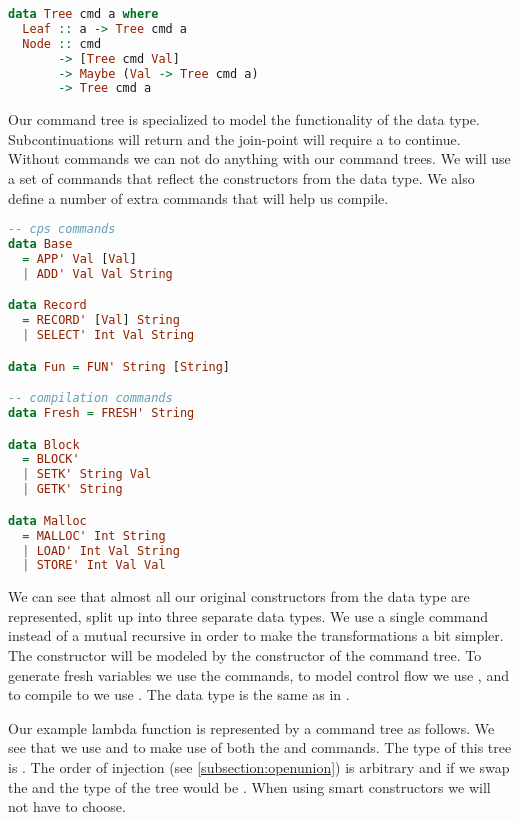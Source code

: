 \begin{lstlisting}[language=Haskell]
data Tree cmd a where
  Leaf :: a -> Tree cmd a
  Node :: cmd
       -> [Tree cmd Val]
       -> Maybe (Val -> Tree cmd a)
       -> Tree cmd a
\end{lstlisting}

Our command tree is specialized to model the functionality of the  data type. Subcontinuations will return  and the join-point will require a  to continue. Without commands we can not do anything with our command trees. We will use a set of commands that reflect the constructors from the  data type. We also define a number of extra commands that will help us compile.

\begin{lstlisting}[language=Haskell]
-- cps commands
data Base
  = APP' Val [Val]
  | ADD' Val Val String

data Record
  = RECORD' [Val] String
  | SELECT' Int Val String

data Fun = FUN' String [String]

-- compilation commands
data Fresh = FRESH' String

data Block
  = BLOCK'
  | SETK' String Val
  | GETK' String

data Malloc
  = MALLOC' Int String
  | LOAD' Int Val String
  | STORE' Int Val Val
\end{lstlisting}

We can see that almost all our original constructors from the  data type are represented, split up into three separate data types. We use a single  command instead of a mutual recursive  in order to make the transformations a bit simpler. The  constructor will be modeled by the  constructor of the command tree. To generate fresh variables we use the  commands, to model control flow we use , and to compile to  we use . The  data type is the same as in .

Our example lambda function  is represented by a command tree as follows. We see that we use  and  to make use of both the  and  commands. The type of this tree is . The order of injection (see \ref{subsection:openunion}) is arbitrary and if we swap the  and  the type of the tree would be . When using smart constructors we will not have to choose.

